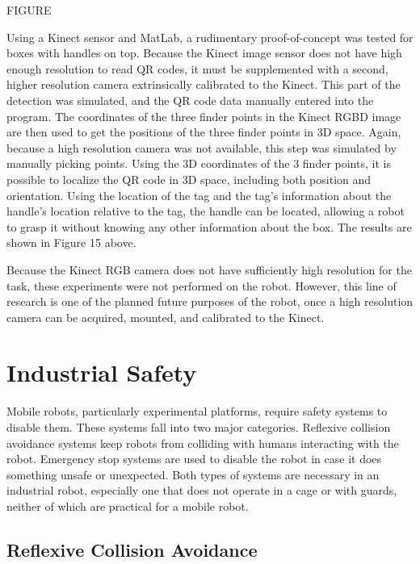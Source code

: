 \documentclass[]{cwru} %
\begin{document}
FIGURE

Using a Kinect sensor and MatLab, a rudimentary proof-of-concept was
tested for boxes with handles on top. Because the Kinect image sensor
does not have high enough resolution to read QR codes, it must be
supplemented with a second, higher resolution camera extrinsically
calibrated to the Kinect. This part of the detection was simulated, and
the QR code data manually entered into the program. The coordinates of
the three finder points in the Kinect RGBD image are then used to get
the positions of the three finder points in 3D space. Again, because a
high resolution camera was not available, this step was simulated by
manually picking points. Using the 3D coordinates of the 3 finder
points, it is possible to localize the QR code in 3D space, including
both position and orientation. Using the location of the tag and the
tag's information about the handle's location relative to the tag, the
handle can be located, allowing a robot to grasp it without knowing any
other information about the box. The results are shown in Figure 15
above.

Because the Kinect RGB camera does not have sufficiently high resolution
for the task, these experiments were not performed on the robot.
However, this line of research is one of the planned future purposes of
the robot, once a high resolution camera can be acquired, mounted, and
calibrated to the Kinect.

\chapter{Industrial Safety}

Mobile robots, particularly experimental platforms, require safety
systems to disable them. These systems fall into two major categories.
Reflexive collision avoidance systems keep robots from colliding with
humans interacting with the robot. Emergency stop systems are used to
disable the robot in case it does something unsafe or unexpected. Both
types of systems are necessary in an industrial robot, especially one
that does not operate in a cage or with guards, neither of which are
practical for a mobile robot.

\section{Reflexive Collision Avoidance}
\label{reflexive-avoidance}
\end{document}
